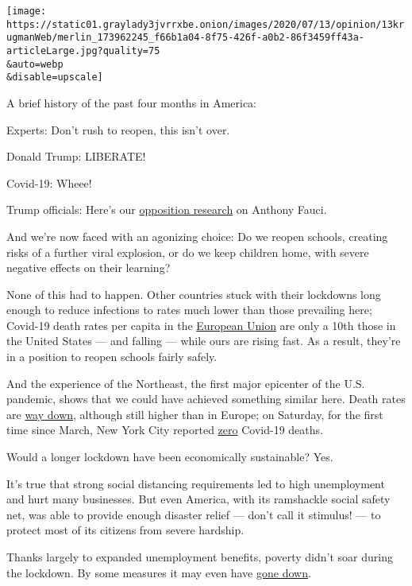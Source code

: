 \texttt{[image: https://static01.graylady3jvrrxbe.onion/images/2020/07/13/opinion/13krugmanWeb/merlin\_173962245\_f66b1a04-8f75-426f-a0b2-86f3459ff43a-articleLarge.jpg?quality=75\\\&auto=webp\\\&disable=upscale]}

A brief history of the past four months in America:

Experts: Don't rush to reopen, this isn't over.

Donald Trump: LIBERATE!

Covid-19: Wheee!

Trump officials: Here's our
\href{https://www.nytimes3xbfgragh.onion/2020/07/12/us/politics/fauci-trump-coronavirus.html}{opposition
research} on Anthony Fauci.

And we're now faced with an agonizing choice: Do we reopen schools,
creating risks of a further viral explosion, or do we keep children
home, with severe negative effects on their learning?

None of this had to happen. Other countries stuck with their lockdowns
long enough to reduce infections to rates much lower than those
prevailing here; Covid-19 death rates per capita in the
\href{https://twitter.com/paulkrugman/status/1282656106762952705}{European
Union} are only a 10th those in the United States --- and falling ---
while ours are rising fast. As a result, they're in a position to reopen
schools fairly safely.

And the experience of the Northeast, the first major epicenter of the
U.S. pandemic, shows that we could have achieved something similar here.
Death rates are
\href{https://covidtracking.com/data/charts/regional-deaths}{way down},
although still higher than in Europe; on Saturday, for the first time
since March, New York City reported
\href{https://www.amny.com/coronavirus/july-11-was-nycs-first-day-without-a-covid-19-death-in-four-months/}{zero}
Covid-19 deaths.

Would a longer lockdown have been economically sustainable? Yes.

It's true that strong social distancing requirements led to high
unemployment and hurt many businesses. But even America, with its
ramshackle social safety net, was able to provide enough disaster relief
--- don't call it stimulus! --- to protect most of its citizens from
severe hardship.

Thanks largely to expanded unemployment benefits, poverty didn't soar
during the lockdown. By some measures it may even have
\href{https://www.nytimes3xbfgragh.onion/2020/06/21/us/politics/coronavirus-poverty.html}{gone
down}.

